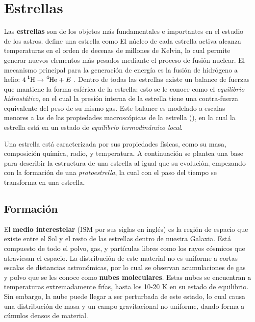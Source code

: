 \chapter{Estrellas}

Las \textbf{estrellas} son de los objetos más fundamentales e importantes en el
estudio de los astros.  define una
estrella como 
El núcleo de cada estrella activa alcanza temperaturas en el orden de decenas de
millones de Kelvin, lo cual permite generar nuevos elementos más pesados mediante el
proceso de fusión nuclear. El mecanismo principal para la generación de energía
es la fusión de hidrógeno a helio: $\ce{4 ^1H} \rightarrow \ce{^4He} + E$ .
Dentro de todas las estrellas existe un balance de fuerzas que mantiene la forma
esférica de la estrella; esto se le conoce como el \textit{equilibrio
hidrostático}, en el cual la presión interna de la estrella tiene una
contra-fuerza equivalente del peso de su mismo gas. Este balance es modelado a
escalas menores a las de las propiedades macroscópicas de la estrella
(), en la cual la
estrella está en un estado de \textit{equilibrio termodinámico local}. 

Una estrella está caracterizada por sus propiedades físicas, como su masa,
composición química, radio, y temperatura. A continuación se plantea una base
para describir la estructura de una estrella al igual que su evolución,
empezando con la formación de una \textit{protoestrella}, la cual con el paso del
tiempo se transforma en una estrella.

\section{Formación}

El \textbf{medio interestelar} (ISM por sus siglas en inglés) es la región de
espacio que existe entre el Sol y el resto de las estrellas dentro de nuestra
Galaxia. Está compuesto de todo el polvo, gas, y partículas libres como los
rayos cósmicos que atraviesan el espacio. La distribución de este material no es
uniforme a cortas escalas de distancias astronómicas, por lo cual se observan
acumulaciones de gas y polvo que se les conoce como \textbf{nubes moleculares}.
Estas nubes se encuentran a temperaturas extremadamente frías, hasta los
10-20 K en su estado de equilibrio. Sin embargo, la nube puede llegar a ser
perturbada de este estado, lo cual causa una distribución de masa y un campo
gravitacional no uniforme, dando forma a cúmulos densos de material.

